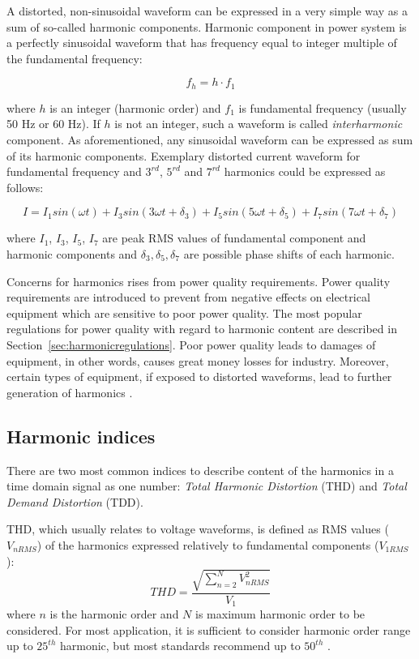 \documentclass[12pt]{report} %
\begin{document}
A distorted, non-sinusoidal waveform can be expressed in a very simple way as a sum of so-called harmonic components. Harmonic component in power system is a perfectly sinusoidal waveform that has frequency equal to integer multiple of the fundamental frequency:

\begin{equation} 
 	f_h=h\cdot f_1
\end{equation}

where $h$ is an integer (harmonic order) and $f_1$ is fundamental frequency (usually 50 Hz or 60 Hz). If $h$ is not an integer, such a waveform is called \textit{interharmonic} component.
As aforementioned, any sinusoidal waveform can be expressed as sum of its harmonic components. Exemplary distorted current waveform for fundamental frequency and $3^{rd}$, $5^{rd}$ and $7^{rd}$ harmonics could be expressed as follows:

\begin{equation} 
	I=I_1  sin(\omega t)+I_3  sin(3\omega t+\delta_3 )+I_5  sin(5\omega t+\delta_5 )+I_7  sin(7\omega t+\delta_7 )
\end{equation}

where $I_1$, $I_3$, $I_5$, $I_7$ are peak RMS values of fundamental component and harmonic components and $\delta_3 ,\delta_5 ,\delta_7$ are possible phase shifts of each harmonic.

Concerns for harmonics rises from power quality requirements. Power quality requirements are introduced to prevent from negative effects on electrical equipment which are sensitive to poor power quality. The most popular regulations for power quality with regard to harmonic content are described in Section~\ref{sec:harmonicregulations}. Poor power quality leads to damages of equipment, in other words, causes great money losses for industry. Moreover, certain types of equipment, if exposed to distorted waveforms, lead to further generation of harmonics \cite{das}.

\subsection{Harmonic indices}
There are two most common indices to describe content of the harmonics in a time domain signal as one number: \textit{Total Harmonic Distortion} (THD) and \textit{Total Demand Distortion} (TDD). 

THD, which usually relates to voltage waveforms, is defined as RMS values ($V_{n RMS}$) of the harmonics expressed relatively to fundamental components ($V_{1 RMS}$):
\begin{equation}
	THD = \frac{\sqrt{\sum_{n=2}^{N} V_{n RMS}^2}}{V_1}
\end{equation}
where $n$ is the harmonic order and $N$ is maximum harmonic order to be considered. For most application, it is sufficient to consider harmonic order range up to $25^{th}$ harmonic, but most standards recommend up to $50^{th}$ \cite{das}.
\end{document}
